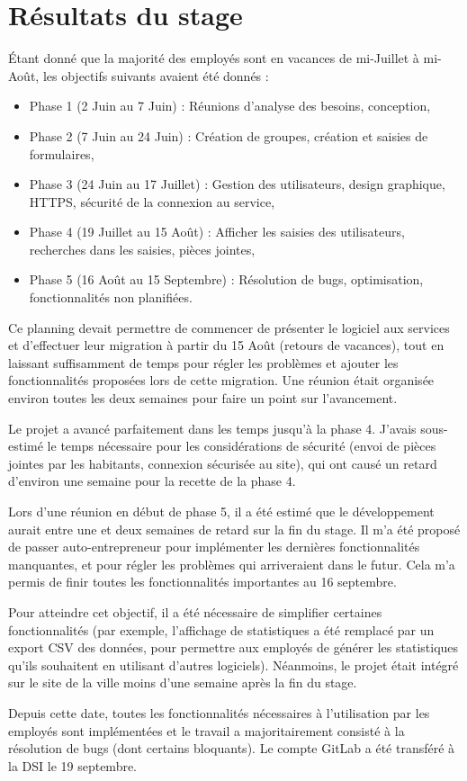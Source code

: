 \section{Résultats du stage}\label{sec:bilan-du-projet}

Étant donné que la majorité des employés sont en vacances de mi-Juillet à mi-Août, les objectifs suivants avaient été donnés :
\begin{itemize}
	\item Phase 1 (2 Juin au 7 Juin) : Réunions d'analyse des besoins, conception,
	\item Phase 2 (7 Juin au 24 Juin) : Création de groupes, création et saisies de formulaires,
	\item Phase 3 (24 Juin au 17 Juillet) : Gestion des utilisateurs, design graphique, HTTPS, sécurité de la connexion au service,
	\item Phase 4 (19 Juillet au 15 Août) : Afficher les saisies des utilisateurs, recherches dans les saisies, pièces jointes,
	\item Phase 5 (16 Août au 15 Septembre) : Résolution de bugs, optimisation, fonctionnalités non planifiées.
\end{itemize}

Ce planning devait permettre de commencer de présenter le logiciel aux services et d'effectuer leur migration à partir du 15 Août (retours de vacances), tout en laissant suffisamment de temps pour régler les problèmes et ajouter les fonctionnalités proposées lors de cette migration.
Une réunion était organisée environ toutes les deux semaines pour faire un point sur l'avancement.

\uparagraph
Le projet a avancé parfaitement dans les temps jusqu'à la phase 4.
J'avais sous-estimé le temps nécessaire pour les considérations de sécurité (envoi de pièces jointes par les habitants, connexion sécurisée au site), qui ont causé un retard d'environ une semaine pour la recette de la phase 4.

Lors d'une réunion en début de phase 5, il a été estimé que le développement aurait entre une et deux semaines de retard sur la fin du stage.
Il m'a été proposé de passer auto-entrepreneur pour implémenter les dernières fonctionnalités manquantes, et pour régler les problèmes qui arriveraient dans le futur.
Cela m'a permis de finir toutes les fonctionnalités importantes au 16 septembre.

Pour atteindre cet objectif, il a été nécessaire de simplifier certaines fonctionnalités (par exemple, l'affichage de statistiques a été remplacé par un export CSV des données, pour permettre aux employés de générer les statistiques qu'ils souhaitent en utilisant d'autres logiciels).
Néanmoins, le projet était intégré sur le site de la ville moins d'une semaine après la fin du stage.

Depuis cette date, toutes les fonctionnalités nécessaires à l'utilisation par les employés sont implémentées et le travail a majoritairement consisté à la résolution de bugs (dont certains bloquants).
Le compte GitLab a été transféré à la DSI le 19 septembre.
